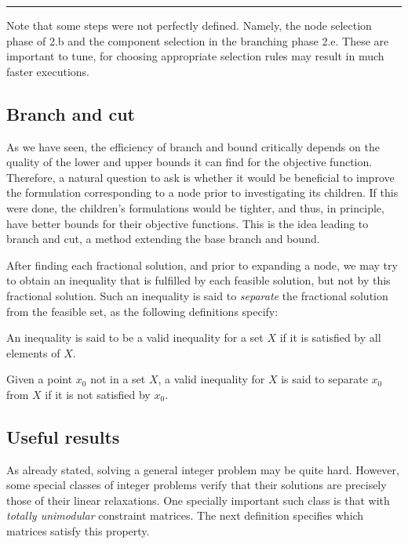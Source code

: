 \hrule
\vspace{20pt}

Note that some steps were not perfectly defined. Namely, the node selection
phase of 2.b and the component selection in the branching phase 2.e. These are
important to tune, for choosing appropriate selection rules may result in much
faster executions.

\subsection{Branch and cut} %

As we have seen, the efficiency of branch and bound critically depends on the
quality of the lower and upper bounds it can find for the objective function.
Therefore, a natural question to ask is whether it would be beneficial to
improve the formulation corresponding to a node prior to investigating its
children. If this were done, the children's formulations would be tighter, and
thus, in principle, have better bounds for their objective functions. This is
the idea leading to branch and cut, a method extending the base branch and
bound.

After finding each fractional solution, and prior to expanding a node, we may
try to obtain an inequality that is fulfilled by each feasible solution, but not
by this fractional solution. Such an inequality is said to \emph{separate} the
fractional solution from the feasible set, as the following definitions specify:

\begin{definition}
    \label{def:valid-inequality}
    
    An inequality is said to be a valid inequality for a set $X$ if it is
    satisfied by all elements of $X$.
\end{definition}

\begin{definition}
    \label{def:separating-inequality}
    
    Given a point $x_0$ not in a set $X$, a valid inequality for $X$ is said to
    separate $x_0$ from $X$ if it is not satisfied by $x_0$.
\end{definition}

\subsection{Useful results} %
As already stated, solving a general integer problem may be quite hard. However,
some special classes of integer problems verify that their solutions are
precisely those of their linear relaxations. One specially important such class
is that with \emph{totally unimodular} constraint matrices. The next definition
specifies which matrices satisfy this property.

